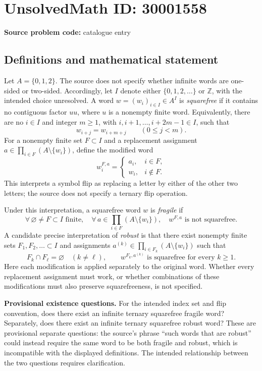 \documentclass[11pt]{article}
\newcommand{\Z}{\mathbb{Z}}
\begin{document}
\section*{UnsolvedMath ID: 30001558}
\textbf{Source problem code:} catalogue entry
\subsection{Definitions and mathematical statement}
Let \(A=\{0,1,2\}\). The source does not specify whether infinite words are one-sided or two-sided. Accordingly, let \(I\) denote either \(\{0,1,2,\ldots\}\) or \(\Z\), with the intended choice unresolved. A word \(w=(w_i)_{i\in I}\in A^I\) is \emph{squarefree} if it contains no contiguous factor \(uu\), where \(u\) is a nonempty finite word. Equivalently, there are no \(i\in I\) and integer \(m\geq1\), with \(i,i+1,\ldots,i+2m-1\in I\), such that
\[
 w_{i+j}=w_{i+m+j}\qquad(0\leq j<m).
\]
For a nonempty finite set \(F\subset I\) and a replacement assignment \(a\in\prod_{i\in F}(A\setminus\{w_i\})\), define the modified word
\[
 w^{F,a}_i=\begin{cases}a_i,&i\in F,\\w_i,&i\notin F.\end{cases}
\]
This interprets a symbol flip as replacing a letter by either of the other two letters; the source does not specify a ternary flip operation.

Under this interpretation, a squarefree word \(w\) is \emph{fragile} if
\[
 \forall\,\varnothing\ne F\subset I\text{ finite},\quad
 \forall\,a\in\prod_{i\in F}(A\setminus\{w_i\}),\quad
 w^{F,a}\text{ is not squarefree}.
\]
A candidate precise interpretation of \emph{robust} is that there exist nonempty finite sets \(F_1,F_2,\ldots\subset I\) and assignments \(a^{(k)}\in\prod_{i\in F_k}(A\setminus\{w_i\})\) such that
\[
 F_k\cap F_\ell=\varnothing\quad(k\ne\ell),\qquad
 w^{F_k,a^{(k)}}\text{ is squarefree for every }k\geq1.
\]
Here each modification is applied separately to the original word. Whether every replacement assignment must work, or whether combinations of these modifications must also preserve squarefreeness, is not specified.

\textbf{Provisional existence questions.} For the intended index set and flip convention, does there exist an infinite ternary squarefree fragile word? Separately, does there exist an infinite ternary squarefree robust word? These are provisional separate questions: the source's phrase ``such words that are robust'' could instead require the same word to be both fragile and robust, which is incompatible with the displayed definitions. The intended relationship between the two questions requires clarification.
\end{document}
